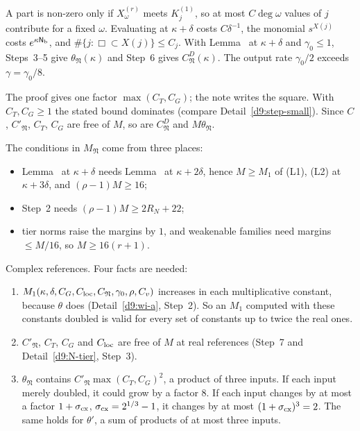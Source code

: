 \begin{detail}
\begin{step}[An external $D$]
\end{step}
\begin{step}[Summation]
A part is non-zero only if $X_\omega^{(r)}$ meets $K_j^{(1)}$, so at most $C\deg\omega$ values of $j$ contribute for a fixed $\omega$. Evaluating at $\kappa+\delta$ costs $C\delta^{-1}$, the monomial $s^{X(j)}$ costs $e^{\kappa\mathsf N_{\rm b}}$, and $\#\{j:\Box\subset X(j)\}\le C_j$. With Lemma~ at $\kappa+\delta$ and $\gamma_0\le1$, Steps~3--5 give $\theta_{\mathfrak N}(\kappa)$ and Step~6 gives $C^D_{\mathfrak N}(\kappa)$. The output rate $\gamma_0/2$ exceeds $\gamma=\gamma_0/8$.

The proof gives one factor $\max(C_T,C_G)$; the note writes the square. With $C_T,C_G\ge1$ the stated bound dominates (compare Detail~\ref{d9:step-small}). Since $C$, $C'_{\mathfrak N}$, $C_T$, $C_G$ are free of $M$, so are $C^D_{\mathfrak N}$ and $M\theta_{\mathfrak N}$.
\end{step}
\begin{step}
The conditions in $M_{\mathfrak N}$ come from three places:
\begin{itemize}
\item Lemma~ at $\kappa+\delta$ needs Lemma~ at $\kappa+2\delta$, hence $M\ge M_1$ of (L1), (L2) at $\kappa+3\delta$, and $(\rho-1)M\ge16$;
\item Step~2 needs $(\rho-1)M\ge2R_N+22$;
\item tier norms raise the margins by $1$, and weakenable families need margins $\le M/16$, so $M\ge16(r+1)$.
\end{itemize}
Complex references. Four facts are needed:
\begin{enumerate}[label=(\roman*)]
\item $M_1(\kappa,\delta,C_G,C_{\rm loc},C_{\mathfrak N},\gamma_0,\rho,C_v)$ increases in each multiplicative constant, because $\theta$ does (Detail~\ref{d9:wi-a}, Step~2). So an $M_1$ computed with these constants doubled is valid for every set of constants up to twice the real ones.
\item $C'_{\mathfrak N}$, $C_T$, $C_G$ and $C_{\rm loc}$ are free of $M$ at real references (Step~7 and Detail~\ref{d9:N-tier}, Step~3).
\item $\theta_{\mathfrak N}$ contains $C'_{\mathfrak N}\max(C_T,C_G)^2$, a product of three inputs. If each input merely doubled, it could grow by a factor $8$. If each input changes by at most a factor $1+\sigma_{\rm cx}$, $\sigma_{\rm cx}=2^{1/3}-1$, it changes by at most $(1+\sigma_{\rm cx})^3=2$. The same holds for $\theta'$, a sum of products of at most three inputs.

\end{enumerate}
\end{step}
\end{detail}
